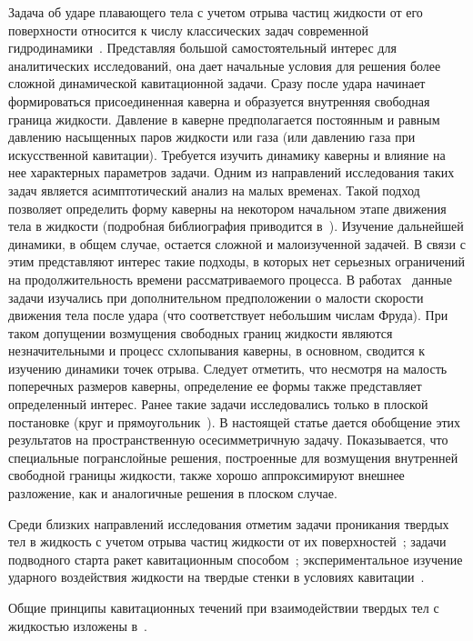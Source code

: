 \documentclass[press]{vestnik}
\begin{document}
Задача об ударе плавающего тела с учетом отрыва частиц жидкости от его 
поверхности относится к числу классических задач современной гидродинамики~\cite{B01}. Представляя большой самостоятельный интерес для аналитических 
исследований, она дает начальные условия для решения более сложной 
динамической кавитационной задачи. Сразу после удара начинает формироваться 
присоединенная каверна и образуется внутренняя свободная граница жидкости. 
Давление в каверне предполагается постоянным и равным давлению насыщенных 
паров жидкости или газа (или давлению газа при искусственной кавитации). 
Требуется изучить динамику каверны и влияние на нее характерных параметров 
задачи. Одним из направлений исследования таких задач является 
асимптотический анализ на малых временах. Такой подход позволяет определить 
форму каверны на некотором начальном этапе движения тела в жидкости 
(подробная библиография приводится в~\cite{B02}). Изучение дальнейшей динамики, в 
общем случае, остается сложной и малоизученной задачей. В связи с этим 
представляют интерес такие подходы, в которых нет серьезных ограничений на 
продолжительность времени рассматриваемого процесса. В работах~\cite{B03,B04} данные 
задачи изучались при дополнительном предположении о малости скорости 
движения тела после удара (что соответствует небольшим числам Фруда). При 
таком допущении возмущения свободных границ жидкости являются 
незначительными и процесс схлопывания каверны, в основном, сводится к 
изучению динамики точек отрыва. Следует отметить, что несмотря на малость 
поперечных размеров каверны, определение ее формы также представляет 
определенный интерес. Ранее такие задачи исследовались только в плоской 
постановке (круг и прямоугольник~\cite{B03,B04}). В настоящей статье дается обобщение 
этих результатов на пространственную осесимметричную задачу. Показывается, 
что специальные погранслойные решения, построенные для возмущения внутренней 
свободной границы жидкости, также хорошо аппроксимируют внешнее разложение, 
как и аналогичные решения в плоском случае. 

Среди близких направлений исследования отметим задачи проникания твердых тел 
в жидкость с учетом отрыва частиц жидкости от их поверхностей~\cite{B05}; задачи 
подводного старта ракет кавитационным способом~\cite{B06}; экспериментальное 
изучение ударного воздействия жидкости на твердые стенки в условиях 
кавитации~\cite{B07,B08}. 

Общие принципы кавитационных течений при взаимодействии твердых тел с 
жидкостью изложены в~\cite{B09,B10}. 
\end{document}
